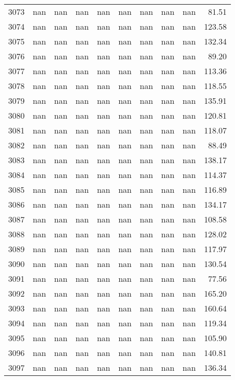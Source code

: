 \begin{tabular}{lrrrrrrrrr}
3073 & nan & nan & nan & nan & nan & nan & nan & nan & 81.51 \\
3074 & nan & nan & nan & nan & nan & nan & nan & nan & 123.58 \\
3075 & nan & nan & nan & nan & nan & nan & nan & nan & 132.34 \\
3076 & nan & nan & nan & nan & nan & nan & nan & nan & 89.20 \\
3077 & nan & nan & nan & nan & nan & nan & nan & nan & 113.36 \\
3078 & nan & nan & nan & nan & nan & nan & nan & nan & 118.55 \\
3079 & nan & nan & nan & nan & nan & nan & nan & nan & 135.91 \\
3080 & nan & nan & nan & nan & nan & nan & nan & nan & 120.81 \\
3081 & nan & nan & nan & nan & nan & nan & nan & nan & 118.07 \\
3082 & nan & nan & nan & nan & nan & nan & nan & nan & 88.49 \\
3083 & nan & nan & nan & nan & nan & nan & nan & nan & 138.17 \\
3084 & nan & nan & nan & nan & nan & nan & nan & nan & 114.37 \\
3085 & nan & nan & nan & nan & nan & nan & nan & nan & 116.89 \\
3086 & nan & nan & nan & nan & nan & nan & nan & nan & 134.17 \\
3087 & nan & nan & nan & nan & nan & nan & nan & nan & 108.58 \\
3088 & nan & nan & nan & nan & nan & nan & nan & nan & 128.02 \\
3089 & nan & nan & nan & nan & nan & nan & nan & nan & 117.97 \\
3090 & nan & nan & nan & nan & nan & nan & nan & nan & 130.54 \\
3091 & nan & nan & nan & nan & nan & nan & nan & nan & 77.56 \\
3092 & nan & nan & nan & nan & nan & nan & nan & nan & 165.20 \\
3093 & nan & nan & nan & nan & nan & nan & nan & nan & 160.64 \\
3094 & nan & nan & nan & nan & nan & nan & nan & nan & 119.34 \\
3095 & nan & nan & nan & nan & nan & nan & nan & nan & 105.90 \\
3096 & nan & nan & nan & nan & nan & nan & nan & nan & 140.81 \\
3097 & nan & nan & nan & nan & nan & nan & nan & nan & 136.34 \\

\end{tabular}
